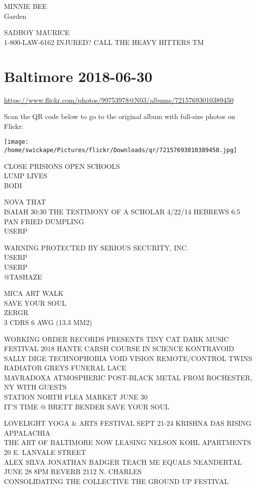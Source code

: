 \documentclass[10pt,letterpaper]{article}
\begin{document}
MINNIE BEE\\
Garden

SADBOY MAURICE\\
1{-}800{-}LAW{-}6162 INJURED?  CALL THE HEAVY HITTERS TM
\pagebreak

\section*{Baltimore 2018-06-30}

\url{https://www.flickr.com/photos/99753978@N03/albums/72157693010389450}

Scan the QR code below to go to the original album with full-size photos on Flickr:

\texttt{[image: /home/swickape/Pictures/flickr/Downloads/qr/72157693010389450.jpg]}
\pagebreak

CLOSE PRISIONS OPEN SCHOOLS\\
LUMP LIVES\\
BODI

NOVA THAT\\
ISAIAH 30:30 THE TESTIMONY OF A SCHOLAR 4/22/14 HEBREWS 6:5\\
PAN FRIED DUMPLING\\
USERP

WARNING PROTECTED BY SERIOUS SECURITY, INC.\\
USERP\\
USERP\\
@TASHAZE

MICA ART WALK\\
SAVE YOUR SOUL\\
ZERGR\\
3 CDRS 6 AWG (13.3 MM2)

WORKING ORDER RECORDS PRESENTS TINY CAT DARK MUSIC FESTIVAL 2018 HANTE CARSH COURSE IN SCIENCE KONTRAVOID SALLY DIGE TECHNOPHOBIA VOID VISION REMOTE/CONTROL TWINS RADIATOR GREYS FUNERAL LACE\\
MAVRADOXA ATMOSPHERIC POST{-}BLACK METAL FROM ROCHESTER, NY WITH GUESTS\\
STATION NORTH FLEA MARKET JUNE 30\\
IT'S TIME @ BRETT BENDER SAVE YOUR SOUL

LOVELIGHT YOGA \& ARTS FESTIVAL SEPT 21{-}24 KRISHNA DAS RISING APPALACHIA\\
THE ART OF BALTIMORE NOW LEASING NELSON KOHL APARTMENTS 20 E. LANVALE STREET\\
ALEX SILVA JONATHAN BADGER TEACH ME EQUALS NEANDERTAL JUNE 28 8PM REVERB 2112 N. CHARLES\\
CONSOLIDATING THE COLLECTIVE THE GROUND UP FESTIVAL
\end{document}
